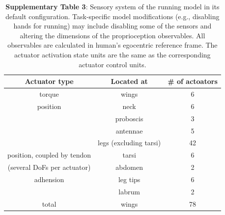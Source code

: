\documentclass[sn-mathphys-num]{sn-jnl}%
\theoremstyle{thmstyleone}%
\theoremstyle{thmstyletwo}%
\theoremstyle{thmstylethree}%
\begin{document}
\begin{appendices}
\begin{table}[htbp]
\begin{tabular}{cc}
		\bottomrule
	\end{tabular}%
	\label{tab:s_1}%
\end{table}%





\begin{table}[htbp]
	\centering
	\small
	\caption{%
		\textbf{Supplementary Table 3}: 
		Sensory system of the running model in its default configuration. 
		Task-specific model modifications (e.g., disabling hands for running) may include disabling some of the sensors and altering the dimensions of the proprioception observables. 
		All observables are calculated in human's egocentric reference frame. 
		The actuator activation state units are the same as the corresponding actuator control units.}
	\begin{tabular}{ccc}
		\toprule
		Actuator type         &        Located at  & \# of actoators     \\
		\midrule
		torque      &   wings      &      6  \\
		position      &   neck      &      6  \\
		      &   proboscis      &      3  \\
		      &   antennae      &      5  \\
		      &   legs (excluding tarsi)      &      42  \\
		\midrule
		position, coupled by tendon      &   tarsi      &      6  \\
		(several DoFs per actuator)      &   abdomen      &      2  \\
		\midrule
		adhension      &   leg tips      &      6  \\
		      &   labrum      &      2  \\
		\midrule
		total      &   wings      &      78  \\
		
		\bottomrule
	\end{tabular}%
	\label{tab:s_2}%
\end{table}%





\end{appendices}
\end{document}

